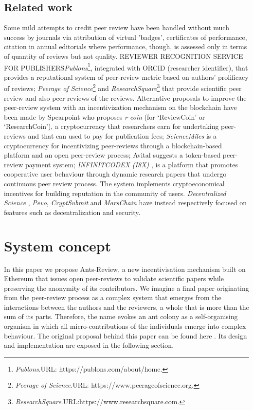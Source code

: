\documentclass[runningheads]{llncs}
\begin{document}
\subsection{Related work} Some mild attempts to credit peer review have been handled without much success by journals via attribution of virtual 'badges', certificates of performance, citation in annual editorials where performance, though, is assessed only in terms of quantity of reviews but not quality.
\newline REVIEWER RECOGNITION SERVICE FOR PUBLISHERS\emph{Publons}\footnote[1]{\emph{Publons}.\textsc{URL:} https://publons.com/about/home.}, integrated with ORCID (researcher identifier), that provides a reputational system of peer-review metric based on authors' prolificacy of reviews; \emph{Peerage of Science}\footnote[2]{\emph{Peerage of Science}.\textsc{URL:} https://www.peerageofscience.org.} and \emph{ResearchSquare}\footnote[3]{\emph{ResearchSquare}.\textsc{URL:}https://www.researchsquare.com.} that provide scientific peer review and also peer-reviews of the reviews.
\newline Alternative proposals to improve the peer-review system with an incentivization mechanism on the blockchain have been made by Spearpoint \cite{ResearchCoin} who proposes \emph{r-coin} (for ‘ReviewCoin’ or ‘ResearchCoin’), a cryptocurrency that researchers earn for undertaking peer-reviews and that can used to pay for publication fees; \emph{ScienceMiles} \cite{ScienceMiles} is a cryptocurrency for incentivizing peer-reviews through a blockchain-based platform and an open peer-review process; Avital \cite{AvitalToken} suggests a token-based peer-review payment system; \emph{INFINITCODEX (I8X)} \cite{I8X}, is a platform that promotes cooperative user behaviour through dynamic research papers that undergo  continuous peer review process. The system implements cryptoeconomical incentives for building reputation in the community of users. \emph{Decentralized Science} \cite{DecentralSc2,DecentralSc1}, \emph{Pevo}\cite{Pevo}, \emph{CryptSubmit}\cite{CryptSubmit} and \emph{MarsChain}\cite{MarsChain} have instead respectively focused on features such as decentralization and security.

\section{System concept}
In this paper we propose Ants-Review, a new incentivisation mechanism built on Ethereum that issues open peer-reviews to validate scientific papers while preserving the anonymity of its contributors. We imagine a final paper originating from the peer-review process as a complex system that emerges from the interactions between the authors and the reviewers, a whole that is more than the sum of its parts. Therefore, the name evokes an ant colony as a self-organising organism in which all micro-contributions of the individuals emerge into complex behaviour.
\newline The original proposal behind this paper can be found here \cite{AntsReview}.
\newline Its design and implementation are exposed in the following section.
\end{document}
